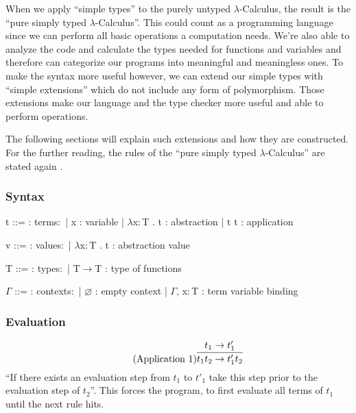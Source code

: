 When we apply ``simple types'' to the purely untyped
$\lambda$-Calculus, the result is the ``pure simply typed $\lambda$-Calculus''.
This could count as a programming language since we can perform
all basic operations a computation needs. We're also able to analyze
the code and calculate the types needed for functions and variables
and therefore can categorize our programs into meaningful and
meaningless ones. To make the syntax more useful however, we can extend
our simple types with ``simple extensions'' which do not include any
form of polymorphism. Those extensions make our language and the type
checker more useful and able to perform operations.

The following sections will explain such extensions and how they are constructed.
For the further reading, the rules of the ``pure simply typed $\lambda$-Calculus''
are stated again \cite{pierce2002ProgLang}.

\subsubsection{Syntax}
\begin{bnfgrammar}
    t ::= : terms$\colon$
    | x : variable
    | $\lambda$x$\colon$T . t : abstraction
    | t t : application
\end{bnfgrammar}\leavevmode\newline

\begin{bnfgrammar}
    v ::= : values$\colon$
    | $\lambda$x$\colon$T . t : abstraction value
\end{bnfgrammar}\leavevmode\newline

\begin{bnfgrammar}
    T ::= : types$\colon$
    | T$\rightarrow$T : type of functions
\end{bnfgrammar}\leavevmode\newline

\begin{bnfgrammar}
    $\Gamma$ ::= : contexts$\colon$
    | $\varnothing$ : empty context
    | $\Gamma$, x$\colon$T : term variable binding
\end{bnfgrammar}\leavevmode\newline

\subsubsection{Evaluation}
\begin{equation*}
    \tag{Application 1}
    \infer{
        t_1 t_2 \rightarrow t'_1 t_2
    }{
        t_1 \rightarrow t'_1
    }
\end{equation*}
``If there exists an evaluation step from $t_1$ to $t'_1$ take this step
prior to the evaluation step of $t_2$''. This forces the program, to first
evaluate all terms of $t_1$ until the next rule hits.

